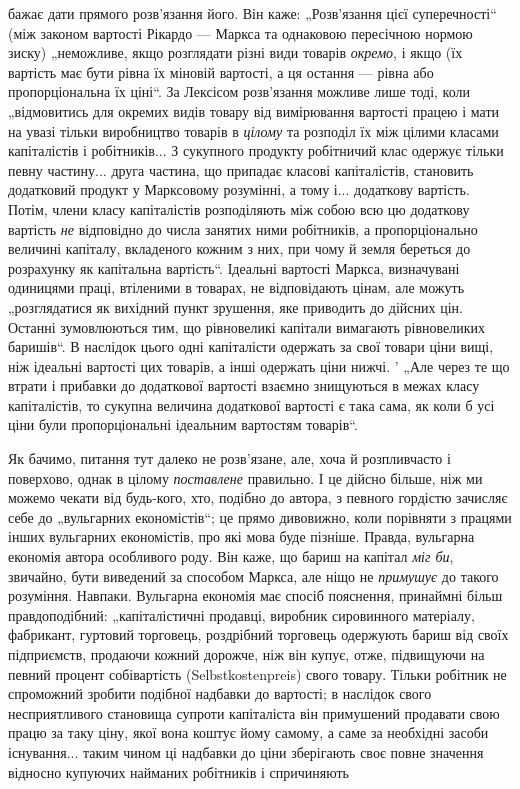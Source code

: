 \parcont{}  %
бажає дати прямого розв’язання його. Він каже: „Розв’язання
цієї суперечності“ (між законом вартості Рікардо — Маркса та однаковою
пересічною нормою зиску) „неможливе, якщо розглядати
різні види товарів \emph{окремо}, і якщо (їх вартість має бути
рівна їх міновій вартості, а ця остання — рівна або пропорціональна
їх ціні“. За Лексісом розв’язання можливе лише тоді,
коли „відмовитись для окремих видів товару від вимірювання
вартості працею і мати на увазі тільки виробництво товарів
в \emph{цілому} та розподіл їх між цілими класами капіталістів і робітників...
З сукупного продукту робітничий клас одержує тільки
певну частину... друга частина, що припадає класові капіталістів,
становить додатковий продукт у Марксовому розумінні, а тому і...
додаткову вартість. Потім, члени класу капіталістів розподіляють
між собою всю цю додаткову вартість \emph{не} відповідно до числа
занятих ними робітників, а пропорціонально величині капіталу,
вкладеного кожним з них, при чому й земля береться до розрахунку
як капітальна вартість“. Ідеальні вартості Маркса, визначувані
одиницями праці, втіленими в товарах, не відповідають
цінам, але можуть „розглядатися як вихідний пункт зрушення,
яке приводить до дійсних цін. Останні зумовлюються тим, що
рівновеликі капітали вимагають рівновеликих баришів“. В наслідок
цього одні капіталісти одержать за свої товари ціни вищі,
ніж ідеальні вартості цих товарів, а інші одержать ціни нижчі. '
„Але через те що втрати і прибавки до додаткової вартості
взаємно знищуються в межах класу капіталістів, то сукупна
величина додаткової вартості є така сама, як коли б усі ціни
були пропорціональні ідеальним вартостям товарів“.

Як бачимо, питання тут далеко не розв’язане, але, хоча й
розпливчасто і поверхово, однак в цілому \emph{поставлене} правильно.
І це дійсно більше, ніж ми можемо чекати від будь-кого,
хто, подібно до автора, з певного гордістю зачисляє себе
до „вульгарних економістів“; це прямо дивовижно, коли порівняти
з працями інших вульгарних економістів, про які мова буде
пізніше. Правда, вульгарна економія автора особливого роду.
Він каже, що бариш на капітал \emph{міг би}, звичайно, бути виведений
за способом Маркса, але ніщо не \emph{примушує} до такого розуміння.
Навпаки. Вульгарна економія має спосіб пояснення, принаймні
більш правдоподібний: „капіталістичні продавці, виробник
сировинного матеріалу, фабрикант, гуртовий торговець,
роздрібний торговець одержують бариш від своїх підприємств,
продаючи кожний дорожче, ніж він купує, отже, підвищуючи
на певний процент собівартість (Selbstkostenpreis) свого товару.
Тільки робітник не спроможний зробити подібної надбавки до
вартості; в наслідок свого несприятливого становища супроти
капіталіста він примушений продавати свою працю за таку ціну,
якої вона коштує йому самому, а саме за необхідні засоби існування...
таким чином ці надбавки до ціни зберігають своє повне
значення відносно купуючих найманих робітників і спричиняють
\parbreak{}  %
